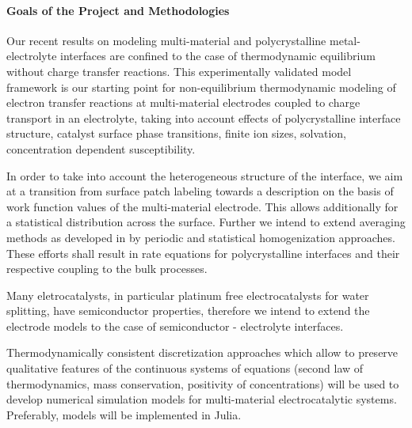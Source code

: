 \documentclass[a4paper,10pt]{article}
\begin{document}


\paragraph{Goals of the Project and Methodologies}
Our recent results on modeling multi-material and polycrystalline metal-electrolyte interfaces are confined to the case of thermodynamic equilibrium without charge transfer reactions. This experimentally validated model framework is our starting point for non-equilibrium thermodynamic modeling of electron transfer reactions at multi-material electrodes coupled to charge transport in an electrolyte, taking into account  effects of polycrystalline interface structure, catalyst surface phase transitions, finite ion sizes, solvation, concentration dependent susceptibility.

In order to take into account  the heterogeneous structure of the interface, we aim at a transition from surface patch labeling towards a description %
on the basis of work function values of the multi-material electrode. This allows additionally for a statistical distribution across the surface. Further we intend to extend averaging methods as developed in \cite{JES}  by periodic and statistical homogenization approaches.
%
These efforts shall result in  rate   equations  for polycrystalline interfaces  and their respective coupling to the bulk processes.

Many eletrocatalysts, in particular platinum free electrocatalysts for water splitting, have semiconductor properties, therefore we intend to extend the electrode models to the case of semiconductor - electrolyte interfaces.

Thermodynamically consistent discretization approaches which allow to preserve qualitative features of the continuous systems of equations  (second law of thermodynamics, mass conservation, positivity of concentrations) will be used to  develop numerical simulation models for multi-material electrocatalytic systems.  Preferably, models will be implemented in  Julia.
\end{document}
